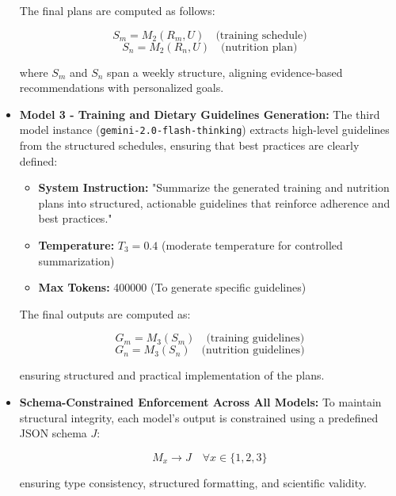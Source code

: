 \documentclass[conference]{IEEEtran}
\begin{document}
\begin{itemize}
    The final plans are computed as follows:

    \[
    S_m = M_2(R_m, U) \quad \text{(training schedule)}
    \]
    \[
    S_n = M_2(R_n, U) \quad \text{(nutrition plan)}
    \]

    where $S_m$ and $S_n$ span a weekly structure, aligning evidence-based recommendations with personalized goals.

    \item \textbf{Model 3 - Training and Dietary Guidelines Generation:}  
    The third model instance (\texttt{gemini-2.0-flash-thinking}) extracts high-level guidelines from the structured schedules, ensuring that best practices are clearly defined:

    \begin{itemize}
        \item \textbf{System Instruction:} "Summarize the generated training and nutrition plans into structured, actionable guidelines that reinforce adherence and best practices."
        \item \textbf{Temperature:} $T_3 = 0.4$ (moderate temperature for controlled summarization)
        \item \textbf{Max Tokens:} 400000 (To generate specific guidelines)
    \end{itemize}

    The final outputs are computed as:

    \[
    G_m = M_3(S_m) \quad \text{(training guidelines)}
    \]
    \[
    G_n = M_3(S_n) \quad \text{(nutrition guidelines)}
    \]

    ensuring structured and practical implementation of the plans.

    \item \textbf{Schema-Constrained Enforcement Across All Models:}  
    To maintain structural integrity, each model's output is constrained using a predefined JSON schema $J$:

    \[
    M_x \rightarrow J \quad \forall x \in \{1, 2, 3\}
    \]

    ensuring type consistency, structured formatting, and scientific validity.
\end{itemize}
\end{document}
